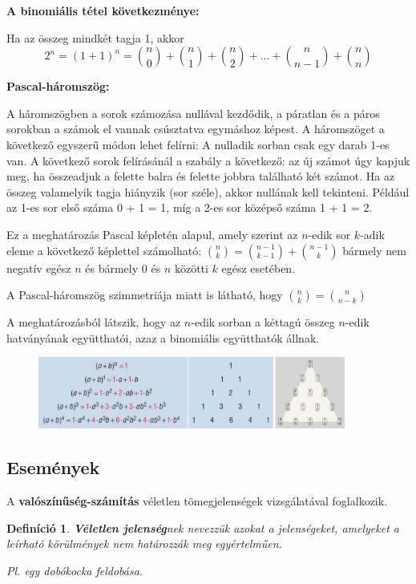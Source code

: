 \documentclass[12pt,a4paper]{article}
\newtheorem{definition}{Definíció} [section]
\begin{document}
\textbf{A binomiális tétel következménye:}

Ha az összeg mindkét tagja 1, akkor
\[2^n=(1+1)^n=\binom{n}{0}+\binom{n}{1}+\binom{n}{2}+...+\binom{n}{n-1}+\binom{n}{n}\]

\textbf{Pascal-háromszög:}

A háromszögben a sorok számozása nullával kezdődik, a páratlan és a páros sorokban a számok el vannak csúsztatva egymáshoz képest. A háromszöget a következő egyszerű módon lehet felírni: A nulladik sorban csak egy darab 1-es van. A következő sorok felírásánál a szabály a következő: az új számot úgy kapjuk meg, ha összeadjuk a felette balra és felette jobbra található két számot. Ha az összeg valamelyik tagja hiányzik (sor széle), akkor nullának kell tekinteni. Például az 1-es sor első száma 0 + 1 = 1, míg a 2-es sor középső száma 1 + 1 = 2.

Ez a meghatározás Pascal képletén alapul, amely szerint az $n$-edik sor $k$-adik eleme a következő képlettel számolható: $\displaystyle\binom{n}{k}=\displaystyle\binom{n-1}{k-1}+\displaystyle\binom{n-1}{k}$ bármely nem negatív egész $n$ és bármely 0 és $n$ közötti $k$ egész esetében.

A Pascal-háromszög szimmetriája miatt is látható, hogy $\displaystyle\binom{n}{k}=\displaystyle\binom{n}{n-k}$

A meghatározásból látszik, hogy az $n$-edik sorban a kéttagú összeg $n$-edik hatványának együtthatói, azaz a binomiális együtthatók állnak.
\begin{figure}[h]
\centering
\includegraphics[width=0.9\textwidth]{paszkal_haromszog}
\end{figure}

\subsection{Események}
A \textbf{valószínűség-számítás} véletlen tömegjelenségek vizsgálatával foglalkozik.

\begin{definition}
\textbf{Véletlen jelenség}nek nevezzük azokat a jelenségeket, amelyeket a leírható körülmények nem határozzák meg egyértelműen.

Pl. egy dobókocka feldobása.
\end{definition}
\end{document}
